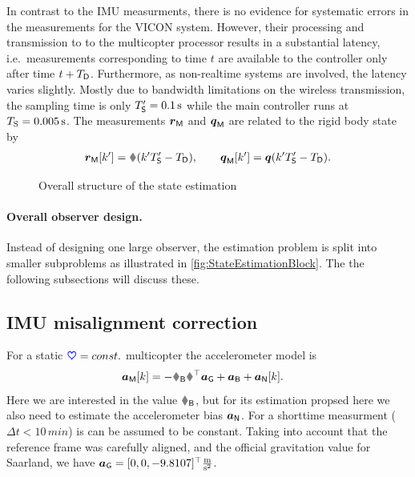 In contrast to the IMU measurments, there is no evidence for systematic errors in the measurements for the VICON system.
However, their processing and transmission to to the multicopter processor results in a substantial latency, i.e.\ measurements corresponding to time $t$ are available to the controller only after time $t+T_{\mathsf{D}}$.
Furthermore, as non-realtime systems are involved, the latency varies slightly.
Mostly due to bandwidth limitations on the wireless transmission, the sampling time is only $T'_{\mathsf{S}}=0.1\,\text{s}$ while the main controller runs at $T_{\mathrm{S}}=0.005\,\text{s}$.
The measurements $\boldsymbol{r}_{\mathsf{M}}$ and $\boldsymbol{q}_{\mathsf{M}}$ are related to the rigid body state by
\begin{align}
 \rVIC[k'] = \r(k'\TsVIC - \TVICD),
\qquad
 \qVIC[k'] = \quat(k'\TsVIC - \TVICD).
\end{align}

\begin{figure}
 \centering
 
 \caption{Overall structure of the state estimation}
 \label{fig:StateEstimationBlock}
\end{figure}

\paragraph{Overall observer design.}
Instead of designing one large observer, the estimation problem is split into smaller subproblems as illustrated in \autoref{fig:StateEstimationBlock}.
The the following subsections will discuss these.




\subsection{IMU misalignment correction}
For a static $\boldsymbol{\textcolor{blue}{\heartsuit}}=const.$ multicopter the accelerometer model is
\begin{align}
 \aIMU[k] &=  -\RIMUBR \R^\top \gravityAcc + \aIMUB + \aIMUN[k].
\end{align} 
Here we are interested in the value $\RIMUBR$, but for its estimation propsed here we also need to estimate the accelerometer bias $\boldsymbol{a}_{\mathsf{N}}$.
For a shorttime measurment ($\Delta t<10\,\unit{min}$) is can be assumed to be constant.
Taking into account that the reference frame was carefully aligned, and the official gravitation value for Saarland, we have $\boldsymbol{a}_{\mathsf{G}} = [0, 0, -9.8107]^\top \tfrac{\text{m}}{\text{s}^2}$.

